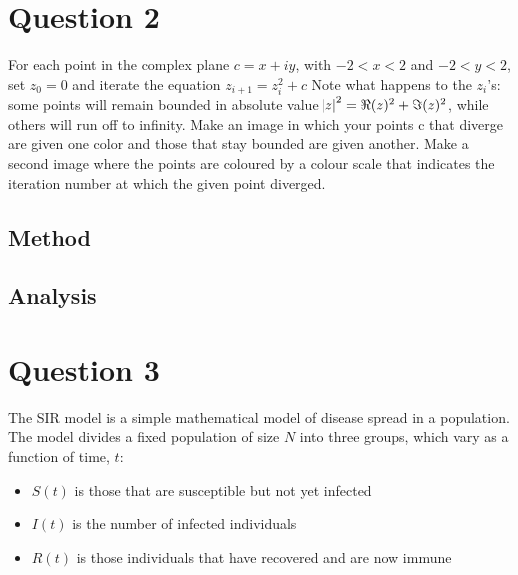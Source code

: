 \documentclass[12pt]{article}
\begin{document}
 \section{Question 2}
 For each point in the complex plane $c = x + iy$, with $−2 < x < 2$ and $−2 < y < 2$, set $z_{0} = 0$ and iterate the equation $z_{i+1} = z^{2}_{i} + c$ Note what happens to the $z_{i}$’s: some points will remain bounded in absolute value $\abs{z}^{2} = \Re(z)^{2} + \Im(z)^{2}$, while others will run off to infinity. Make an image in which your points c that diverge are given one color and those that stay bounded are given another. Make a second image where the points are coloured by a colour scale that indicates the iteration number at which the given point diverged.
 
 \subsection{Method}
 
 \subsection{Analysis}
 
 \section{Question 3}
The SIR model is a simple mathematical model of disease spread in a population. The model divides a fixed population of size $N$ into three groups, which vary as a function of time, $t$:

\begin{itemize}
    \item $S(t)$ is those that are susceptible but not yet infected
    \item $I(t)$ is the number of infected individuals
    \item $R(t)$ is those individuals that have recovered and are now immune
\end{itemize}
\end{document}
